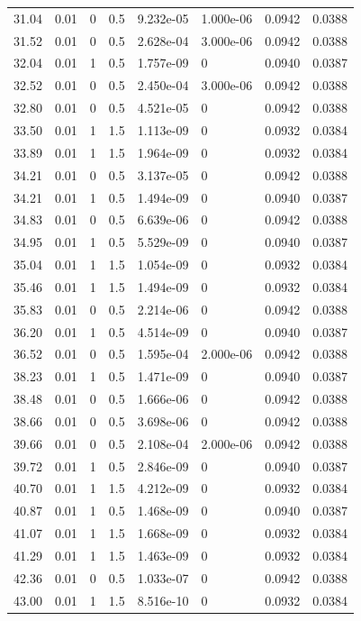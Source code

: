 \documentclass[preview]{standalone}
\begin{document}
{{{\begin{tabular}{L{1.2cm}C{1.2cm} C{0.3cm}C{0.5cm} C{1.4cm}C{1.4cm} C{1.4cm}C{1.4cm}}
  31.04  &  0.01  & 0     & 0.5 &  9.232e-05  & 1.000e-06  & 0.0942 &  0.0388   \\ 
  31.52  &  0.01  & 0     & 0.5 &  2.628e-04  & 3.000e-06  & 0.0942 &  0.0388   \\ 
  32.04  &  0.01  & 1     & 0.5 &  1.757e-09  & 0  & 0.0940 &  0.0387   \\ 
  32.52  &  0.01  & 0     & 0.5 &  2.450e-04  & 3.000e-06  & 0.0942 &  0.0388   \\ 
  32.80  &  0.01  & 0     & 0.5 &  4.521e-05  & 0  & 0.0942 &  0.0388   \\ 
  33.50  &  0.01  & 1     & 1.5 &  1.113e-09  & 0  & 0.0932 &  0.0384   \\ 
  33.89  &  0.01  & 1     & 1.5 &  1.964e-09  & 0  & 0.0932 &  0.0384   \\ 
  34.21  &  0.01  & 0     & 0.5 &  3.137e-05  & 0  & 0.0942 &  0.0388   \\ 
  34.21  &  0.01  & 1     & 0.5 &  1.494e-09  & 0  & 0.0940 &  0.0387   \\ 
  34.83  &  0.01  & 0     & 0.5 &  6.639e-06  & 0  & 0.0942 &  0.0388   \\ 
  34.95  &  0.01  & 1     & 0.5 &  5.529e-09  & 0  & 0.0940 &  0.0387   \\ 
  35.04  &  0.01  & 1     & 1.5 &  1.054e-09  & 0  & 0.0932 &  0.0384   \\ 
  35.46  &  0.01  & 1     & 1.5 &  1.494e-09  & 0  & 0.0932 &  0.0384   \\ 
  35.83  &  0.01  & 0     & 0.5 &  2.214e-06  & 0  & 0.0942 &  0.0388   \\ 
  36.20  &  0.01  & 1     & 0.5 &  4.514e-09  & 0  & 0.0940 &  0.0387   \\ 
  36.52  &  0.01  & 0     & 0.5 &  1.595e-04  & 2.000e-06  & 0.0942 &  0.0388   \\ 
  38.23  &  0.01  & 1     & 0.5 &  1.471e-09  & 0  & 0.0940 &  0.0387   \\ 
  38.48  &  0.01  & 0     & 0.5 &  1.666e-06  & 0  & 0.0942 &  0.0388   \\ 
  38.66  &  0.01  & 0     & 0.5 &  3.698e-06  & 0  & 0.0942 &  0.0388   \\ 
  39.66  &  0.01  & 0     & 0.5 &  2.108e-04  & 2.000e-06  & 0.0942 &  0.0388   \\ 
  39.72  &  0.01  & 1     & 0.5 &  2.846e-09  & 0  & 0.0940 &  0.0387   \\ 
  40.70  &  0.01  & 1     & 1.5 &  4.212e-09  & 0  & 0.0932 &  0.0384   \\ 
  40.87  &  0.01  & 1     & 0.5 &  1.468e-09  & 0  & 0.0940 &  0.0387   \\ 
  41.07  &  0.01  & 1     & 1.5 &  1.668e-09  & 0  & 0.0932 &  0.0384   \\ 
  41.29  &  0.01  & 1     & 1.5 &  1.463e-09  & 0  & 0.0932 &  0.0384   \\ 
  42.36  &  0.01  & 0     & 0.5 &  1.033e-07  & 0  & 0.0942 &  0.0388   \\ 
  43.00  &  0.01  & 1     & 1.5 &  8.516e-10  & 0  & 0.0932 &  0.0384   \\ 
\hline 
\end{tabular} 

}}}
\end{document}
